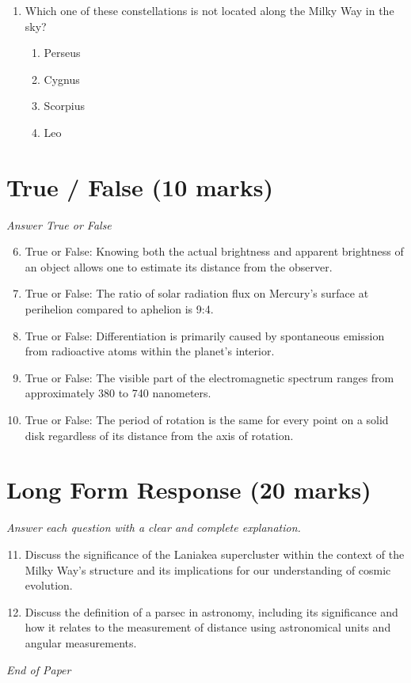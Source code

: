 \documentclass[12pt]{article}
\begin{document}
\begin{enumerate}[label=\arabic*.]
\begin{enumerate}[label=(\alph*)]
    \item metals sank to the center during a time when the interiors were molten throughout.
    \item radioactivity created metals in the core from the decay of uranium.
\end{enumerate}
\item Which one of these constellations is not located along the Milky Way in the sky?
\begin{enumerate}[label=(\alph*)]
    \item Perseus
    \item Cygnus
    \item Scorpius
    \item Leo
\end{enumerate}
\end{enumerate}

\section*{True / False (10 marks)}
\textit{Answer True or False}
\begin{enumerate}[label=\arabic*.]
\setcounter{enumi}{5}
\item True or False: Knowing both the actual brightness and apparent brightness of an object allows one to estimate its distance from the observer.
\item True or False: The ratio of solar radiation flux on Mercury's surface at perihelion compared to aphelion is 9:4.
\item True or False: Differentiation is primarily caused by spontaneous emission from radioactive atoms within the planet's interior.
\item True or False: The visible part of the electromagnetic spectrum ranges from approximately 380 to 740 nanometers.
\item True or False: The period of rotation is the same for every point on a solid disk regardless of its distance from the axis of rotation.
\end{enumerate}

\section*{Long Form Response (20 marks)}
\textit{Answer each question with a clear and complete explanation.}
\begin{enumerate}[label=\arabic*.]
\setcounter{enumi}{10}
\item Discuss the significance of the Laniakea supercluster within the context of the Milky Way's structure and its implications for our understanding of cosmic evolution.
\item Discuss the definition of a parsec in astronomy, including its significance and how it relates to the measurement of distance using astronomical units and angular measurements.
\end{enumerate}

\vfill
\noindent\textit{End of Paper}
\end{document}

